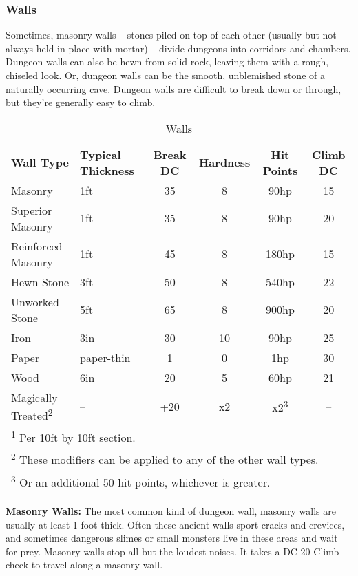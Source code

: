 \subsubsection{Walls}

Sometimes, masonry walls -- stones piled on top of each other (usually but not always 
held in place with mortar) -- divide dungeons into corridors and chambers. Dungeon 
walls can also be hewn from solid rock, leaving them with a rough, chiseled look. 
Or, dungeon walls can be the smooth, unblemished stone of a naturally occurring 
cave. Dungeon walls are difficult to break down or through, but they're generally 
easy to climb.

\begin{table}[htb]
\caption{Walls}
\centering
\begin{tabular}{l l c c c c}
\textbf{Wall Type} & \textbf{Typical Thickness} & \textbf{Break DC} & \textbf{Hardness} & \textbf{Hit Points} & \textbf{Climb DC}\\
Masonry & 1ft & 35 & 8 & 90hp & 15\\
Superior Masonry & 1ft & 35 & 8 & 90hp & 20\\
Reinforced Masonry & 1ft & 45 & 8 & 180hp & 15\\
Hewn Stone & 3ft & 50 & 8 & 540hp & 22\\
Unworked Stone & 5ft & 65 & 8 & 900hp & 20\\
Iron & 3in & 30 & 10 & 90hp & 25\\
Paper & paper-thin & 1 & 0 & 1hp & 30\\
Wood & 6in & 20 & 5 & 60hp & 21\\
Magically Treated\textsuperscript{2} & -- & +20 & x2 & x2\textsuperscript{3} & --\\
\multicolumn{6}{l}{\textsuperscript{1} Per 10ft by 10ft section.}\\
\multicolumn{6}{l}{\textsuperscript{2} These modifiers can be applied to any of the other wall types.}\\
\multicolumn{6}{l}{\textsuperscript{3} Or an additional 50 hit points, whichever is greater.}\\
\end{tabular}
\end{table}

\textbf{Masonry Walls:} The most common kind of dungeon wall, masonry walls are 
usually at least 1 foot thick. Often these ancient walls sport cracks and crevices, 
and sometimes dangerous slimes or small monsters live in these areas and wait for 
prey. Masonry walls stop all but the loudest noises. It takes a DC 20 Climb check 
to travel along a masonry wall.

